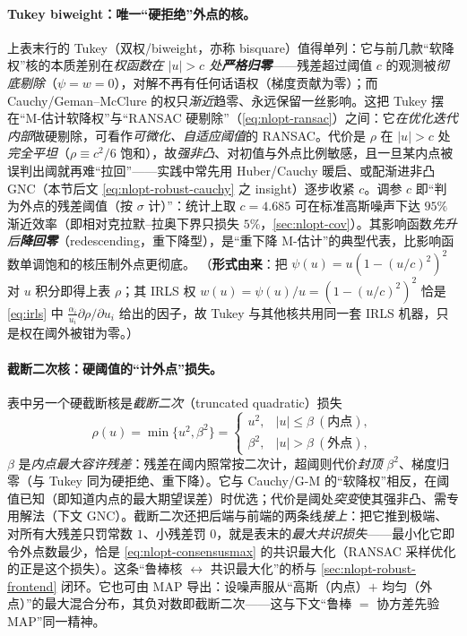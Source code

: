\paragraph{Tukey biweight：唯一“硬拒绝”外点的核。}
上表末行的 Tukey（双权/biweight，亦称 bisquare）值得单列：它与前几款“软降权”核的本质差别在\emph{权函数在 $|u|>c$ 处\textbf{严格归零}}——残差超过阈值 $c$ 的观测被\emph{彻底剔除}（$\psi=w=0$），对解不再有任何话语权（梯度贡献为零）；而 Cauchy/Geman--McClure 的权只\emph{渐近}趋零、永远保留一丝影响。这把 Tukey 摆在“M-估计软降权”与“RANSAC 硬剔除”（\cref{eq:nlopt-ransac}）之间：它\emph{在优化迭代内部}做硬剔除，可看作\emph{可微化、自适应阈值}的 RANSAC。代价是 $\rho$ 在 $|u|>c$ 处\emph{完全平坦}（$\rho\equiv c^2/6$ 饱和），故\emph{强非凸}、对初值与外点比例敏感，且一旦某内点被误判出阈就再难“拉回”——实践中常先用 Huber/Cauchy 暖启、或配渐进非凸 GNC（本节后文 \cref{eq:nlopt-robust-cauchy} 之 insight）逐步收紧 $c$。调参 $c$ 即“判为外点的残差阈值（按 $\sigma$ 计）”：统计上取 $c=4.685$ 可在标准高斯噪声下达 $95\%$ 渐近效率（即相对克拉默--拉奥下界只损失 $5\%$，\cref{sec:nlopt-cov}）\cite{zhang1997parameter}。其影响函数\emph{先升后\textbf{降回零}}（redescending，重下降型），是“重下降 M-估计”的典型代表，比影响函数单调饱和的核压制外点更彻底。
（\textbf{形式由来}：把 $\psi(u)=u(1-(u/c)^2)^2$ 对 $u$ 积分即得上表 $\rho$；其 IRLS 权 $w(u)=\psi(u)/u=(1-(u/c)^2)^2$ 恰是 \cref{eq:irls} 中 $\tfrac{\alpha_i}{u_i}\partial\rho/\partial u_i$ 给出的因子，故 Tukey 与其他核共用同一套 IRLS 机器，只是权在阈外被钳为零。）

\paragraph{截断二次核：硬阈值的“计外点”损失。}\cite{carlone2026handbook}
表中另一个硬截断核是\emph{截断二次}（truncated quadratic）损失
\begin{equation}
  \rho(u)=\min\{u^2,\beta^2\}=
  \begin{cases}u^2,&|u|\le\beta\ (\text{内点}),\\ \beta^2,&|u|>\beta\ (\text{外点}),\end{cases}
  \label{eq:nlopt-truncquad}
\end{equation}
$\beta$ 是\emph{内点最大容许残差}：残差在阈内照常按二次计，超阈则代价\emph{封顶} $\beta^2$、梯度归零（与 Tukey 同为硬拒绝、重下降）。它与 Cauchy/G-M 的“软降权”相反，在阈值已知（即知道内点的最大期望误差）时优选；代价是阈处\emph{突变}使其强非凸、需专用解法（下文 GNC）。截断二次还把后端与前端的两条线\emph{接上}：把它推到极端、对所有大残差只罚常数 $1$、小残差罚 $0$，就是表末的\emph{最大共识损失}——最小化它即令外点数最少，恰是 \cref{eq:nlopt-consensusmax} 的共识最大化（RANSAC 采样优化的正是这个损失）。这条“鲁棒核 $\leftrightarrow$ 共识最大化”的桥与 \cref{sec:nlopt-robust-frontend} 闭环。它也可由 MAP 导出：设噪声服从“高斯（内点）$+$ 均匀（外点）”的最大混合分布，其负对数即截断二次\cite{carlone2026handbook}——这与下文“鲁棒 $=$ 协方差先验 MAP”同一精神。

